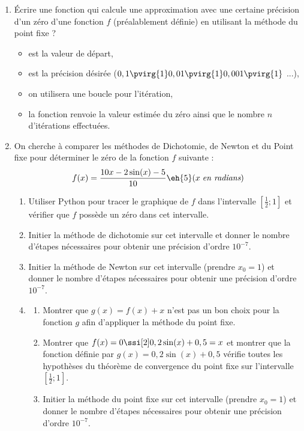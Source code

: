 \begin{boxexstheorieligne}
\begin{enumerate}[label=\textbf{E\thechapter.\arabic*},itemsep=8mm,resume=refexercices]
\item Écrire une fonction  qui calcule une approximation avec une certaine précision d'un zéro d'une fonction $f$ (préalablement définie) en utilisant la méthode du  point fixe  ?
\begin{itemize}\setlength{\itemsep}{1mm}
\item {} est la valeur de départ,
\item {} est la précision désirée ($0,1 \pvirg{1} 0,01 \pvirg{1} 0,001 \pvirg{1}$ ...),
\item on utilisera une boucle  pour l'itération,
\item la fonction renvoie la valeur estimée du zéro ainsi que le nombre $n$ d'itérations effectuées.
\end{itemize}






\item On cherche à comparer les méthodes de Dichotomie, de Newton et du Point fixe pour déterminer le zéro de la fonction $f$ suivante :
$$f(x)=\frac{10x-2\sin(x)-5}{10} \eh{5}(x\;\textrm{\it en radians})$$

\begin{enumerate}[label=\alph*),itemsep=2mm]
\item Utiliser Python pour tracer le graphique de $f$ dans l'intervalle $[\textstyle\frac{1}{2};1]$ et vérifier que $f$ possède un zéro dans cet intervalle.
\item Initier la méthode de dichotomie sur cet intervalle et donner le nombre d'étapes nécessaires pour obtenir une précision d'ordre $10^{-7}$.
\item Initier la méthode de Newton sur cet intervalle (prendre $x_0=1$) et donner le nombre d'étapes nécessaires pour obtenir une précision d'ordre $10^{-7}$. 
\item \begin{enumerate}[label=\roman*)]
\item  Montrer que $g(x)=f(x)+x$ n'est pas un bon choix pour la fonction $g$ afin d'appliquer la méthode du point fixe.
\item Montrer que $f(x)=0 \ssi[2] 0,2\sin(x)+0,5=x$ et montrer que la fonction définie par $g(x)=0,2\sin(x)+0,5$ vérifie toutes les hypothèses du théorème de convergence du point fixe sur l'intervalle $[\textstyle\frac{1}{2};1]$.
\item Initier la méthode du point fixe sur cet intervalle (prendre $x_0=1$) et donner le nombre d'étapes nécessaires pour obtenir une précision d'ordre $10^{-7}$. 
\end{enumerate} 
\end{enumerate}


\end{enumerate}
\end{boxexstheorieligne}
